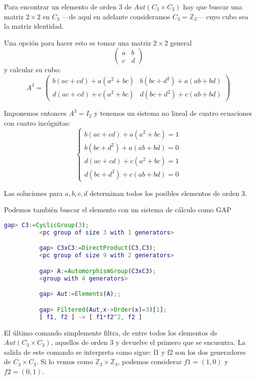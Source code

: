 \documentclass[a4paper, 11pt]{article}
\begin{document}
  \begin{solucion}
      Para encontrar un elemento de orden 3 de $Aut(C_3 \times C_3)$ hay que buscar una matriz $2\times2$ en $C_3$ ---de aquí en adelante consideramos $C_3 = \mathbb{Z}_3$--- cuyo cubo sea la matriz identidad.

      Una opción para hacer esto es tomar una matriz $2\times2$ general
      \[
      \left(
      \begin{array}{cc}
          a & b \\
          c & d
      \end{array}
      \right)
      \]
      y calcular su cubo:
      \[
      A^3 = \left(
      \begin{array}{cc}
          b(ac+cd)+a(a^2+bc) & b(bc+d^2)+a(ab+bd) \\
          d(ac+cd)+c(a^2+bc) & d(bc+d^2)+c(ab+bd)
      \end{array}
      \right)
      \]

      Imponemos entonces $A^3 = I_2$ y tenemos un sistema no lineal de cuatro ecuaciones con cuatro incógnitas:
      \[
      \begin{cases}
           b(ac+cd)+a(a^2+bc) = 1 \\
           b(bc+d^2)+a(ab+bd) = 0 \\
           d(ac+cd)+c(a^2+bc) = 1 \\
           d(bc+d^2)+c(ab+bd) = 0
      \end{cases}
      \]

      Las soluciones para $a,b,c,d$ determinan todos los posibles elementos de orden 3.

      Podemos también buscar el elemento con un sistema de cálculo como GAP
      \begin{lstlisting}[language=GAP]
          gap> C3:=CyclicGroup(3);
          <pc group of size 3 with 1 generators>

          gap> C3xC3:=DirectProduct(C3,C3);
          <pc group of size 9 with 2 generators>

          gap> A:=AutomorphismGroup(C3xC3);
          <group with 4 generators>

          gap> Aut:=Elements(A);;

          gap> Filtered(Aut,x->Order(x)=3)[1];
          [ f1, f2 ] -> [ f1*f2^2, f2 ]
      \end{lstlisting}
  \end{solucion}

  El último comando simplemente filtra, de entre todos los elementos de $Aut(C_3 \times C_3)$, aquellos de orden 3 y devuelve el primero que se encuentra. La salida de este comando se interpreta como sigue: f1 y f2 son los dos generadores de $C_3 \times C_3$. Si lo vemos como $\mathbb{Z}_3 \times \mathbb{Z}_3$, podemos considerar $f1 = (1,0)$ y $f2 = (0,1)$.
\end{document}
